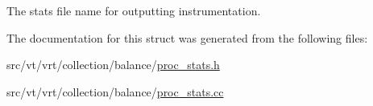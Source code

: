 The stats file name for outputting instrumentation. 



The documentation for this struct was generated from the following files\+:\begin{DoxyCompactItemize}
\item 
src/vt/vrt/collection/balance/\hyperlink{proc__stats_8h}{proc\+\_\+stats.\+h}\item 
src/vt/vrt/collection/balance/\hyperlink{proc__stats_8cc}{proc\+\_\+stats.\+cc}\end{DoxyCompactItemize}
